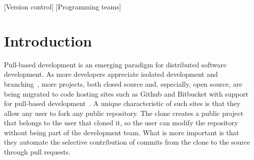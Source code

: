 \documentclass{sig-alternate}
\begin{document}
[Version control]
[Programming teams]



\section{Introduction}

%

Pull-based development is an emerging paradigm for distributed software
development. As more developers appreciate isolated
development and branching~\cite{Bird12}, more projects, both closed source and,
especially, open source, are being migrated to code hosting sites such as Github
and Bitbucket with support for pull-based development~\cite{Barr12}. A unique
characteristic of such sites is that they allow any user to fork any public
repository. The clone creates a public project that belongs to the user that
cloned it, so the user can modify the repository without being part of the
development team. What is more important is that they automate the selective
contribution of commits from the clone to the source through pull requests. 
\end{document}
